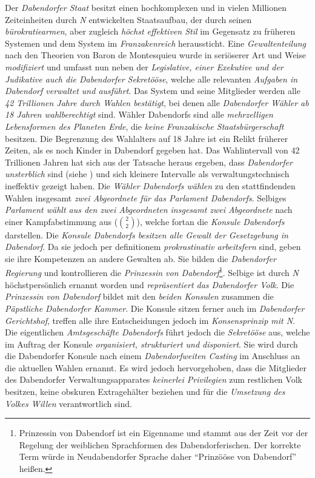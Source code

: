\noindent Der \textit{Dabendorfer Staat} besitzt einen hochkomplexen und in vielen Millionen Zeiteinheiten durch \textit{N} entwickelten Staatsaufbau, der durch seinen \textit{bürokratiearmen}, aber zugleich \textit{höchst effektiven Stil} im Gegensatz zu früheren Systemen und dem System im \textit{Franzakenreich} heraussticht. Eine \textit{Gewaltenteilung} nach den Theorien von Baron de Montesquieu wurde in seriöserer Art und Weise \textit{modifiziert} und umfasst nun neben der \textit{Legislative, einer Exekutive und der Judikative auch die Dabendorfer Sekretööse}, welche alle relevanten \textit{Aufgaben in Dabendorf verwaltet und ausführt}. Das System und seine Mitglieder werden alle \textit{42 Trillionen Jahre durch Wahlen bestätigt}, bei denen alle \textit{Dabendorfer Wähler ab 18 Jahren wahlberechtigt} sind. Wähler Dabendorfs sind alle \textit{mehrzelligen Lebensformen des Planeten Erde}, die \textit{keine Franzakische Staatsbürgerschaft} besitzen. Die Begrenzung des Wahlalters auf 18 Jahre ist ein Relikt früherer Zeiten, als es noch Kinder in Dabendorf gegeben hat. Das Wahlintervall von 42 Trillionen Jahren hat sich aus der Tatsache heraus ergeben, dass \textit{Dabendorfer unsterblich} sind (siehe \textit{}) und sich kleinere Intervalle als verwaltungstechnisch ineffektiv gezeigt haben. Die \textit{Wähler Dabendorfs wählen} zu den stattfindenden Wahlen insgesamt \textit{zwei Abgeordnete für das Parlament Dabendorfs}. Selbiges \textit{Parlament wählt aus den zwei Abgeordneten insgesamt zwei Abgeordnete} nach einer Kampfabstimmung aus ($\binom{2}{2}$), welche fortan die \textit{Konsule Dabendorfs} darstellen. Die \textit{Konsule Dabendorfs besitzen alle Gewalt der Gesetzgebung in Dabendorf}. Da sie jedoch per definitionem \textit{prokrastinativ arbeitsfern} sind, geben sie ihre Kompetenzen an andere Gewalten ab. Sie bilden die \textit{Dabendorfer Regierung} und kontrollieren die \textit{Prinzessin von Dabendorf}\footnote{Prinzessin von Dabendorf ist ein Eigenname und stammt aus der Zeit vor der Regelung der weiblichen Sprachformen des Dabendorferischen. Der korrekte Term würde in Neudabendorfer Sprache daher \enquote{Prinzööse von Dabendorf} heißen.}. Selbige ist durch \textit{N} höchstpersönlich ernannt worden und \textit{repräsentiert das Dabendorfer Volk}. Die \textit{Prinzessin von Dabendorf} bildet mit den \textit{beiden Konsulen} zusammen die \textit{Päpstliche Dabendorfer Kammer}. Die Konsule sitzen ferner auch im \textit{Dabendorfer Gerichtshof}, treffen alle ihre Entscheidungen jedoch im \textit{Konsensprinzip mit N}. Die eigentlichen \textit{Amtsgeschäfte Dabendorfs} führt jedoch die \textit{Sekretööse} aus, welche im Auftrag der Konsule \textit{organisiert, strukturiert und disponiert}. Sie wird durch die Dabendorfer Konsule nach einem \textit{Dabendorfweiten Casting} im Anschluss an die aktuellen Wahlen ernannt. Es wird jedoch hervorgehoben, dass die Mitglieder des Dabendorfer Verwaltungsapparates \textit{keinerlei Privilegien} zum restlichen Volk besitzen, keine obskuren Extragehälter beziehen und für die \textit{Umsetzung des Volkes Willen} verantwortlich sind.

